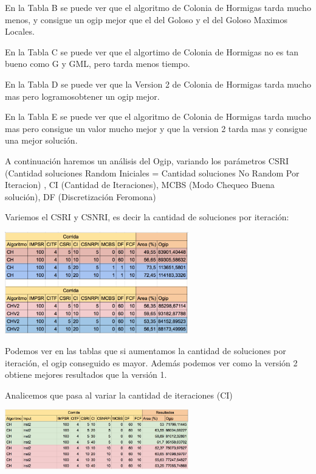 En la Tabla B se puede ver que el algoritmo de Colonia de Hormigas tarda mucho menos, y consigue un ogip mejor que el del Goloso y el del Goloso Maximos Locales.

En la Tabla C se puede ver que el algortimo de Colonia de Hormigas no es tan bueno como G y GML, pero tarda menos tiempo.

En la Tabla D se puede ver que la Version 2 de Colonia de Hormigas tarda mucho mas pero logramosobtener un ogip mejor.

En la Tabla E se puede ver que el algoritmo de Colonia de Hormigas tarda mucho mas pero consigue un valor mucho mejor y que la version 2 tarda mas y consigue una mejor soluci\'on.

A continuaci\'on haremos un an\'alisis del Ogip, variando los par\'ametros CSRI (Cantidad soluciones Random Iniciales = Cantidad soluciones No Random Por Iteracion) , CI (Cantidad de Iteraciones), MCBS (Modo Chequeo Buena soluci\'on), DF (Discretizaci\'on Feromona)

Variemos el CSRI y CSNRI, es decir la cantidad de soluciones por iteraci\'on:

\begin{center}
\includegraphics[width=0.6\textwidth]{imagenes/tabla14}
\end{center}

Podemos ver en las tablas que si aumentamos la cantidad de soluciones por iteraci\'on, el ogip conseguido es mayor. Adem\'as podemos ver como la versi\'on 2 obtiene mejores resultados que la versi\'on 1.

Analicemos que pasa al variar la cantidad de iteraciones (CI)

\begin{center}
\includegraphics[width=0.6\textwidth]{imagenes/tabla15}
\end{center}

